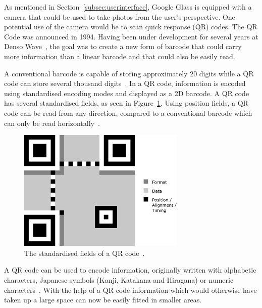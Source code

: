 As mentioned in Section~\ref{subsec:userinterface}, Google Glass is equipped with a camera that could be used to take photos from the user's perspective. One potential use of the camera would be to scan quick response (QR) codes. The QR Code was announced in 1994. Having been under development for several years at Denso Wave~\cite{qrCodeHistory}, the goal was to create a new form of barcode that could carry more information than a linear barcode and that could also be easily read.

A conventional barcode is capable of storing approximately 20 digits while a QR code can store several thousand digits~\cite{qrCodeType}. In a QR code, information is encoded using standardised encoding modes and displayed as a 2D barcode. A QR code has several standardised fields, as seen in Figure~\ref{qrcodeMall}. Using position fields, a QR code can be read from any direction, compared to a conventional barcode which can only be read horizontally~\cite{qrCodeAbout}.

	
	\begin{figure}[H]%
		\centering
		\includegraphics[width=80mm]{images/qrcodeMall}
		\caption{The standardised fields of a QR code~\cite{qrCodeWiki}.}
		\label{qrcodeMall}
	\end{figure}
	 
A QR code can be used to encode information, originally written with alphabetic characters, Japanese symbols (Kanji, Katakana and Hiragana) or numeric characters~\cite{qrCodeVersion}. With the help of a QR code information which would otherwise have taken up a large space can now be easily fitted in smaller areas.

